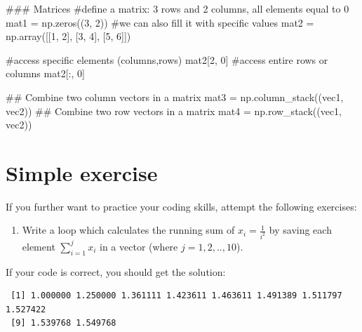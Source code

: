 \documentclass[
  letterpaper,
  DIV=11,
  numbers=noendperiod]{scrreprt}
\newenvironment{Shaded}{\begin{snugshade}}{\end{snugshade}}
\newcommand{\CommentTok}[1]{\textcolor[rgb]{0.37,0.37,0.37}{#1}}
\newcommand{\DecValTok}[1]{\textcolor[rgb]{0.68,0.00,0.00}{#1}}
\newcommand{\NormalTok}[1]{\textcolor[rgb]{0.00,0.23,0.31}{#1}}
\newcommand{\OperatorTok}[1]{\textcolor[rgb]{0.37,0.37,0.37}{#1}}
\providecommand{\tightlist}{%
  \setlength{\itemsep}{0pt}\setlength{\parskip}{0pt}}\usepackage{longtable,booktabs,array}
\begin{document}
\begin{tcolorbox}
\begin{Shaded}
\begin{Highlighting}[]
\CommentTok{\#\#\# Matrices}
\CommentTok{\#define a matrix: 3 rows and 2 columns, all elements equal to 0}
\NormalTok{mat1 }\OperatorTok{=}\NormalTok{ np.zeros((}\DecValTok{3}\NormalTok{, }\DecValTok{2}\NormalTok{))}
\CommentTok{\#we can also fill it with specific values}
\NormalTok{mat2 }\OperatorTok{=}\NormalTok{ np.array([[}\DecValTok{1}\NormalTok{, }\DecValTok{2}\NormalTok{], [}\DecValTok{3}\NormalTok{, }\DecValTok{4}\NormalTok{], [}\DecValTok{5}\NormalTok{, }\DecValTok{6}\NormalTok{]])}

\CommentTok{\#access specific elements (columns,rows)}
\NormalTok{mat2[}\DecValTok{2}\NormalTok{, }\DecValTok{0}\NormalTok{]}
\CommentTok{\#access entire rows or columns}
\NormalTok{mat2[:, }\DecValTok{0}\NormalTok{]}

\CommentTok{\#\# Combine two column vectors in a matrix}
\NormalTok{mat3 }\OperatorTok{=}\NormalTok{ np.column\_stack((vec1, vec2))}
\CommentTok{\#\# Combine two row vectors in a matrix}
\NormalTok{mat4 }\OperatorTok{=}\NormalTok{ np.row\_stack((vec1, vec2))}
\end{Highlighting}
\end{Shaded}

\end{tcolorbox}

\section{Simple exercise}\label{simple-exercise}

If you further want to practice your coding skills, attempt the
following exercises:

\begin{enumerate}
\def\labelenumi{\arabic{enumi}.}
\tightlist
\item
  Write a loop which calculates the running sum of \(x_i=\frac{1}{i^2}\)
  by saving each element \(\sum_{i=1}^{j}x_i\) in a vector (where
  \(j=1,2,..,10\)).
\end{enumerate}

If your code is correct, you should get the solution:

\begin{tcolorbox}[enhanced jigsaw, titlerule=0mm, breakable, bottomrule=.15mm, toprule=.15mm, colbacktitle=quarto-callout-tip-color!10!white, rightrule=.15mm, toptitle=1mm, opacityback=0, left=2mm, coltitle=black, title=\textcolor{quarto-callout-tip-color}{\faLightbulb}\hspace{0.5em}{Solution}, colframe=quarto-callout-tip-color-frame, opacitybacktitle=0.6, leftrule=.75mm, bottomtitle=1mm, arc=.35mm, colback=white]

\begin{verbatim}
 [1] 1.000000 1.250000 1.361111 1.423611 1.463611 1.491389 1.511797 1.527422
 [9] 1.539768 1.549768
\end{verbatim}

\end{tcolorbox}
\end{document}
